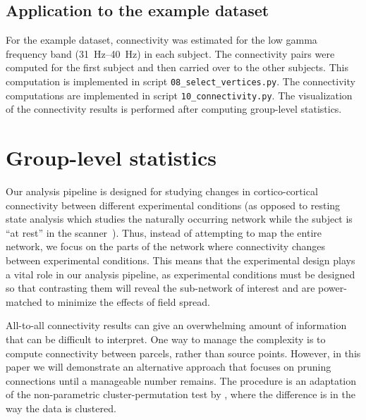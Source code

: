 \documentclass[utf8]{frontiersSCNS}
\renewcommand{\cite}[1]{~\citep{#1}}
\newcommand{\textcite}[1]{\citet{#1}}
\newcommand{\code}[1]{\lstinline{#1}}
\begin{document}
\subsection{Application to the example dataset}

For the example dataset, connectivity was estimated for the low gamma frequency band (\SIrange{31}{40}{\hertz}) in each subject.
The connectivity pairs were computed for the first subject and then carried over to the other subjects.
This computation is implemented in script \code{08_select_vertices.py}.
The connectivity computations are implemented in script \code{10_connectivity.py}.
The visualization of the connectivity results is performed after computing group-level statistics.


\section{Group-level statistics}\label{statistics}

Our analysis pipeline is designed for studying changes in cortico-cortical connectivity between different experimental conditions (as opposed to resting state analysis which studies the naturally occurring network while the subject is ``at rest'' in the scanner\cite{Rosazza2011}).
Thus, instead of attempting to map the entire network, we focus on the parts of the network where connectivity changes between experimental conditions.
This means that the experimental design plays a vital role in our analysis pipeline, as experimental conditions must be designed so that contrasting them will reveal the sub-network of interest and are power-matched to minimize the effects of field spread.

All-to-all connectivity results can give an overwhelming amount of information that can be difficult to interpret.
One way to manage the complexity is to compute connectivity between parcels, rather than source points.
However, in this paper we will demonstrate an alternative approach that focuses on pruning connections until a manageable number remains.
The procedure is an adaptation of the non-parametric cluster-permutation test by \textcite{Maris2007}, where the difference is in the way the data is clustered.
\end{document}
